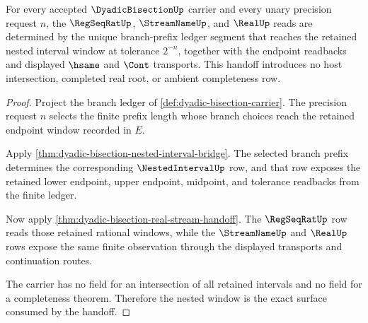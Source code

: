 \begin{theorem}
\label{thm:dyadic-bisection-nested-window-handoff}
For every accepted $\DyadicBisectionUp$ carrier and every unary precision request $n$, the $\RegSeqRatUp$, $\StreamNameUp$, and $\RealUp$ reads are determined by the unique branch-prefix ledger segment that reaches the retained nested interval window at tolerance $2^{-n}$, together with the endpoint readbacks and displayed $\hsame$ and $\Cont$ transports. This handoff introduces no host intersection, completed real root, or ambient completeness row.
\end{theorem}
\begin{proof}
Project the branch ledger of \autoref{def:dyadic-bisection-carrier}. The precision request $n$ selects the finite prefix length whose branch choices reach the retained endpoint window recorded in $E$.

Apply \autoref{thm:dyadic-bisection-nested-interval-bridge}. The selected branch prefix determines the corresponding $\NestedIntervalUp$ row, and that row exposes the retained lower endpoint, upper endpoint, midpoint, and tolerance readbacks from the finite ledger.

Now apply \autoref{thm:dyadic-bisection-real-stream-handoff}. The $\RegSeqRatUp$ row reads those retained rational windows, while the $\StreamNameUp$ and $\RealUp$ rows expose the same finite observation through the displayed transports and continuation routes.

The carrier has no field for an intersection of all retained intervals and no field for a completeness theorem. Therefore the nested window is the exact surface consumed by the handoff.
\end{proof}

